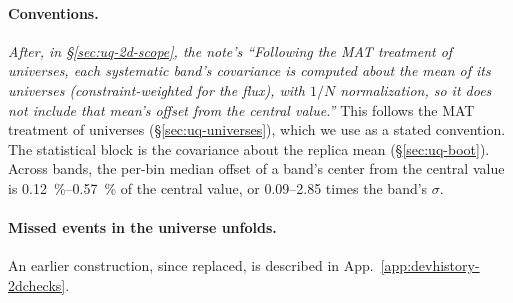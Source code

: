 \paragraph{Conventions.} \emph{After, in \S\ref{sec:uq-2d-scope}, the note's ``Following the MAT treatment of universes, each systematic band's covariance is computed about the mean of its universes (constraint-weighted for the flux), with $1/N$ normalization, so it does not include that mean's offset from the central value.''} This follows the MAT treatment of universes (\S\ref{sec:uq-universes}), which we use as a stated convention. The statistical block is the covariance about the replica mean (\S\ref{sec:uq-boot}). Across bands, the per-bin median offset of a band's center from the central value is \SIrange{0.12}{0.57}{\percent} of the central value, or 0.09--2.85 times the band's $\sigma$. 

\paragraph{Missed events in the universe unfolds.} An earlier construction, since replaced, is described in App.~\ref{app:devhistory-2dchecks}. 

